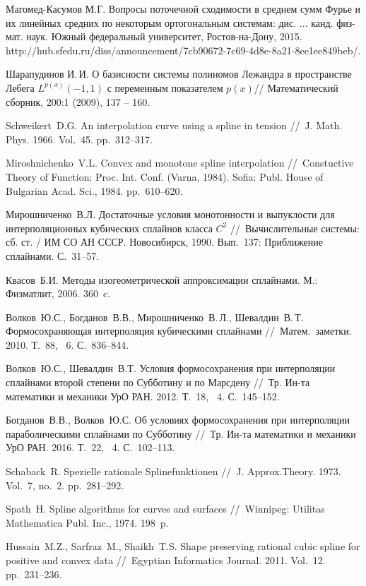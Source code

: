 \begin{thebibliography}{111}
Магомед-Касумов М.Г. Вопросы поточечной сходимости в среднем сумм Фурье и их линейных средних по некоторым ортогональным системам: дис. ... канд. физ-мат. наук. Южный федеральный университет, Ростов-на-Дону, 2015.	http://hub.sfedu.ru/diss/announcement/7cb90672-7c69-4d8e-8a21-8ee1ee849beb/.


Шарапудинов И.\,И. О базисности системы полиномов Лежандра в пространстве Лебега $L^{p(x)}(-1,1)$ с переменным показателем $p(x)$// Математический сборник, 200:1 (2009), 137 -- 160.



Schweikert~D.G. An interpolation curve using a spline in tension
//~J. Math. Phys. 1966. Vol.~45. pp.~312--317.


Miroshnichenko~V.L. Convex and monotone spline interpolation
//~Constuctive Theory of Function: Proc. Int. Conf. (Varna, 1984).  Sofia:
Publ. House of Bulgarian Acad. Sci., 1984. pp.~610--620.

Мирошниченко~В.Л. Достаточные условия монотонности и выпуклости
для интерполяционных кубических сплайнов класса $C^2$
//~Вычислительные системы: сб. ст. / ИМ СО АН СССР.
Новосибирск, 1990. Вып.~137: Приближение сплайнами. С.~31--57.

Квасов~Б.И. Методы изогеометрической аппроксимации сплайнами.
 М.: Физматлит, 2006. 360~c.

Волков~Ю.С., Богданов~В.В., Мирошниченко~В.\,Л., Шевалдин~В.\,Т.
Формосохраняющая интерполяция кубическими сплайнами //~Матем.~заметки. 2010. Т.~88, \No~6. С.~836--844.

Волков~Ю.С., Шевалдин~В.Т.
Условия формосохранения при интерполяции сплайнами второй степени по Субботину и по Марсдену
//~Тр. Ин-та математики и механики УрО РАН. 2012. Т.~18, \No~4. С.~145--152.

Богданов~В.В., Волков~Ю.С.
Об условиях формосохранения при интерполяции параболическими сплайнами по Субботину
//~Тр. Ин-та математики и механики УрО РАН. 2016. Т.~22, \No~4. С.~102--113.

Schaback~R. Spezielle rationale Splinefunktionen
//~J. Approx.Theory.  1973. Vol.~7, no.~2. pp.~281--292.

Spath~H. Spline algorithms for curves and surfaces
//~Winnipeg: Utilitas Mathematica Publ. Inc., 1974. 198~p.

Hussain~M.Z., Sarfraz~M., Shaikh~T.S.
Shape preserving rational cubic spline for positive and convex data
//~Egyptian Informatics Journal. 2011. Vol.~12. pp.~231--236.


\end{thebibliography}
